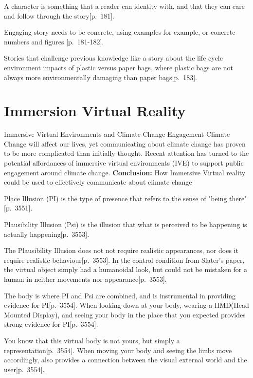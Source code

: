     A character is something that a reader can identity with, and that they can care and follow through the story\citep{engagingStoryFundamentals}[p.~181].
    
    Engaging story needs to be concrete, using examples for example, or concrete numbers and figures \citep{engagingStoryFundamentals}[p.~181-182].
    
    Stories that challenge previous knowledge like a story about the life cycle environment impacts of plastic versus paper bags, where plastic bags are not always more environmentally damaging than paper bags\citep{engagingStoryFundamentals}[p.~183].
    
\section{Immersion Virtual Reality}
    Immersive Virtual Environments and Climate Change Engagement
    Climate Change will affect our lives, yet communicating about climate change has proven to be more complicated than initially thought. Recent attention has turned to the potential affordances of immersive virtual environments (IVE) to support public engagement around climate change\cite{vrEngagementClimateChange}.
    \textbf{Conclusion: } How Immersive Virtual reality could be used to effectively communicate about climate change

    Place Illusion (PI) is the type of presence that refers to the sense of "being there"\citep{vrImmersion}[p.~3551].
    
    Plausibility Illusion (Psi) is the illusion that what is perceived to be happening is actually happening\citep{vrImmersion}[p.~3553].
    
    The Plausibility Illusion does not not require realistic appearances, nor does it require realistic behaviour\citep{vrImmersion}[p.~3553]. In the control condition from Slater's paper, the virtual object simply had a humanoidal look, but could not be mistaken for a human in neither movements nor appearance\citep{vrImmersion}[p.~3553].
    
    The body is where PI and Psi are combined, and is instrumental in providing evidence for PI\citep{vrImmersion}[p.~3554]. When looking down at your body, wearing a HMD(Head Mounted Display), and seeing your body in the place that you expected provides strong evidence for PI\citep{vrImmersion}[p.~3554].
    
    You know that this virtual body is not yours, but simply a representation\citep{vrImmersion}[p.~3554]. When moving your body and seeing the limbs move accordingly, also provides a connection between the visual external world and the user\citep{vrImmersion}[p.~3554].


